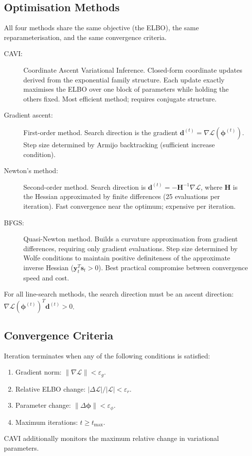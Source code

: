 \documentclass[11pt,a4paper]{article}
\begin{document}
\subsection{Optimisation Methods}

All four methods share the same objective (the ELBO), the same reparameterisation,
and the same convergence criteria.

\begin{description}
  \item[CAVI:] Coordinate Ascent Variational Inference.
    Closed-form coordinate updates derived from the exponential family structure.
    Each update exactly maximises the ELBO over one block of parameters while holding
    the others fixed.
    Most efficient method; requires conjugate structure.
  \item[Gradient ascent:] First-order method.
    Search direction is the gradient $\bm{d}^{(t)} = \nabla\mathcal{L}(\bm{\phi}^{(t)})$.
    Step size determined by Armijo backtracking (sufficient increase condition).
  \item[Newton's method:] Second-order method.
    Search direction is $\bm{d}^{(t)} = -\bm{H}^{-1}\nabla\mathcal{L}$,
    where $\bm{H}$ is the Hessian approximated by finite differences (25 evaluations
    per iteration).
    Fast convergence near the optimum; expensive per iteration.
  \item[BFGS:] Quasi-Newton method.
    Builds a curvature approximation from gradient differences, requiring only
    gradient evaluations.
    Step size determined by Wolfe conditions to maintain positive definiteness of
    the approximate inverse Hessian ($\bm{y}_t^T\bm{s}_t > 0$).
    Best practical compromise between convergence speed and cost.
\end{description}

For all line-search methods, the search direction must be an ascent direction:
$\nabla\mathcal{L}(\bm{\phi}^{(t)})^T\bm{d}^{(t)} > 0$.

\subsection{Convergence Criteria}

Iteration terminates when any of the following conditions is satisfied:
\begin{enumerate}[label=(\roman*)]
  \item Gradient norm: $\lVert\nabla\mathcal{L}\rVert < \varepsilon_g$.
  \item Relative ELBO change: $|\Delta\mathcal{L}|/|\mathcal{L}| < \varepsilon_r$.
  \item Parameter change: $\lVert\Delta\bm{\phi}\rVert < \varepsilon_\phi$.
  \item Maximum iterations: $t \geq t_{\max}$.
\end{enumerate}
CAVI additionally monitors the maximum relative change in variational parameters.
\end{document}
